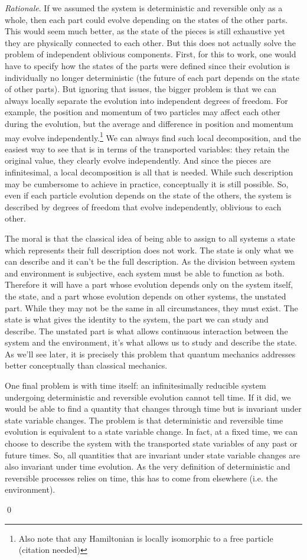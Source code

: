 \documentclass[aps,pra,10pt,twocolumn,floatfix,nofootinbib]{revtex4-1}
\numberwithin{equation}{section}
\theoremstyle{definition}
\newenvironment{rationale}{\emph{Rationale}.}{\qed}
\begin{document}
\begin{rationale}
	If we assumed the system is deterministic and reversible only as a whole, then each part could evolve depending on the states of the other parts. This would seem much better, as the state of the pieces is still exhaustive yet they are physically connected to each other. But this does not actually solve the problem of independent oblivious components. First, for this to work, one would have to specify how the states of the parts were defined since their evolution is individually no longer deterministic (the future of each part depends on the state of other parts). But ignoring that issues, the bigger problem is that we can always locally separate the evolution into independent degrees of freedom. For example, the position and momentum of two particles may affect each other during the evolution, but the average and difference in position and momentum may evolve independently.\footnote{Also note that any Hamiltonian is locally isomorphic to a free particle (citation needed)} We can always find such local decomposition, and the easiest way to see that is in terms of the transported variables: they retain the original value, they clearly evolve independently. And since the pieces are infinitesimal, a local decomposition is all that is needed. While such description may be cumbersome to achieve in practice, conceptually it is still possible. So, even if each particle evolution depends on the state of the others, the system is described by degrees of freedom that evolve independently, oblivious to each other.	
	
	The moral is that the classical idea of being able to assign to all systems a state which represents their full description does not work. The state is only what we can describe and it can't be the full description. As the division between system and environment is subjective, each system must be able to function as both. Therefore it will have a part whose evolution depends only on the system itself, the state, and a part whose evolution depends on other systems, the unstated part. While they may not be the same in all circumstances, they must exist. The state is what gives the identity to the system, the part we can study and describe. The unstated part is what allows continuous interaction between the system and the environment, it's what allows us to study and describe the state. As we'll see later, it is precisely this problem that quantum mechanics addresses better conceptually than classical mechanics.
	
	One final problem is with time itself: an infinitesimally reducible system undergoing deterministic and reversible evolution cannot tell time. If it did, we would be able to find a quantity that changes through time but is invariant under state variable changes. The problem is that deterministic and reversible time evolution is equivalent to a state variable change. In fact, at a fixed time, we can choose to describe the system with the transported state variables of any past or future times. So, all quantities that are invariant under state variable changes are also invariant under time evolution. As the very definition of deterministic and reversible processes relies on time, this has to come from elsewhere (i.e. the environment).
	

\end{rationale}
\end{document}
